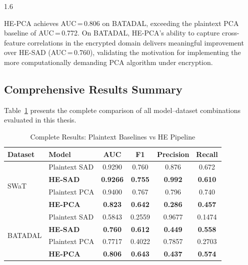 \begin{spacing}{1.6}

HE-PCA achieves AUC\,=\,0.806 on BATADAL, exceeding the plaintext PCA
baseline of AUC\,=\,0.772. On BATADAL, HE-PCA's ability to capture
cross-feature correlations in the encrypted domain delivers meaningful
improvement over HE-SAD (AUC\,=\,0.760), validating the motivation for
implementing the more computationally demanding PCA algorithm under
encryption.

\subsection{Comprehensive Results Summary}

Table~\ref{tab:all_results} presents the complete comparison of all
model--dataset combinations evaluated in this thesis.

\end{spacing}

\begin{table}[!ht]
\centering
\caption{Complete Results: Plaintext Baselines vs HE Pipeline}
\label{tab:all_results}
\begin{tabular}{llcccc}
\toprule
\textbf{Dataset} & \textbf{Model} & \textbf{AUC} & \textbf{F1} &
  \textbf{Precision} & \textbf{Recall} \\
\midrule
\multirow{4}{*}{SWaT}
  & Plaintext SAD & 0.9290 & 0.760  & 0.876  & 0.672  \\
  & \textbf{HE-SAD}  & \textbf{0.9266} & \textbf{0.755} & \textbf{0.992} & \textbf{0.610} \\
  & Plaintext PCA & 0.9400 & 0.767  & 0.796    & 0.740    \\
  & \textbf{HE-PCA}  & \textbf{0.823}  & \textbf{0.642} & \textbf{0.286} & \textbf{0.457} \\
\midrule
\multirow{4}{*}{BATADAL}
  & Plaintext SAD & 0.5843 & 0.2559 & 0.9677 & 0.1474 \\
  & \textbf{HE-SAD}  & \textbf{0.760}  & \textbf{0.612} & \textbf{0.449} & \textbf{0.558} \\
  & Plaintext PCA & 0.7717 & 0.4022 & 0.7857 & 0.2703 \\
  & \textbf{HE-PCA}  & \textbf{0.806}  & \textbf{0.643} & \textbf{0.437} & \textbf{0.574} \\
\bottomrule
\end{tabular}
\end{table}

